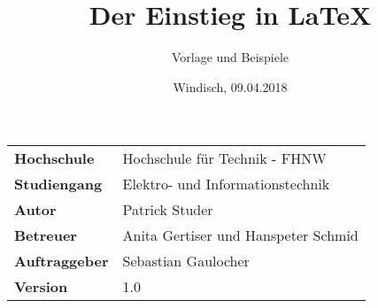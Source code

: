 \documentclass[final]{fhnwreport}       %
\title{Der Einstieg in \LaTeX}          %
\author{Vorlage und Beispiele}          %
\date{Windisch, 09.04.2018}             %
\begin{document}
\maketitle

\vspace*{-1cm}						    %
\vfill
\begin{figure}[H]
\centering
\end{figure}
\vfill

{
\renewcommand\arraystretch{2}
\begin{center}
\begin{tabular}{>{\bf}p{4cm} l}
Hochschule                 &    Hochschule für Technik - FHNW\\
Studiengang                &    Elektro- und Informationstechnik\\
Autor   		           & 	Patrick Studer\\
Betreuer                   &    Anita Gertiser und Hanspeter Schmid\\
Auftraggeber               &    Sebastian Gaulocher\\
Version                    &    1.0 %
\end{tabular}
\end{center}
}

\clearpage
			
\thispagestyle{empty}


\tableofcontents
\clearpage


\clearpage


\clearpage


\clearpage


\clearpage



{\sloppypar
\printbibliography
\label{sec:lit}
\printbibliography
}



{%
}
\end{document}
